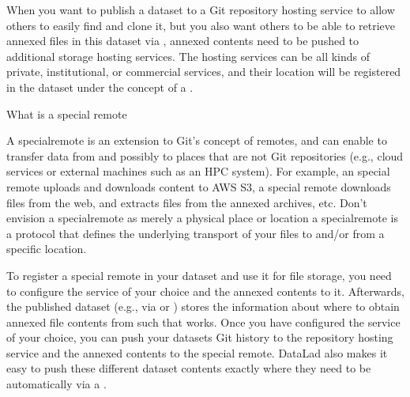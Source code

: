 \sphinxAtStartPar
When you want to publish a dataset to a Git repository hosting service to allow others to easily find and clone it, but you also want others to be able to retrieve annexed files in this dataset via , annexed contents need to be pushed to additional storage hosting services.
The hosting services can be all kinds of private, institutional, or commercial services, and their location will be registered in the dataset under the concept of a {\hyperref[\detokenize{glossary:term-special-remote}]{}}.

\ignorespaces \begin{findoutmore}[label={index-0}, before title={\thetcbcounter\ }, check odd page=true]{What is a special remote}
\label{\detokenize{basics/101-138-sharethirdparty:index-0}}

\sphinxAtStartPar
A special\sphinxhyphen{}remote is an extension to Git’s concept of remotes, and can
enable {\hyperref[\detokenize{glossary:term-git-annex}]{}} to transfer data from and possibly to places that are not Git
repositories (e.g., cloud services or external machines such as an HPC
system). For example, an  special remote uploads and downloads content
to AWS S3, a  special remote downloads files from the web, and 
extracts files from the annexed archives, etc. Don’t envision a special\sphinxhyphen{}remote
as merely a physical place or location \textendash{} a special\sphinxhyphen{}remote is a protocol that
defines the underlying transport of your files to and/or from a specific location.


\end{findoutmore}

\sphinxAtStartPar
To register a special remote in your dataset and use it for file storage, you need to configure the service of your choice and  the annexed contents to it. Afterwards, the published dataset (e.g., via {\hyperref[\detokenize{glossary:term-GitHub}]{}} or {\hyperref[\detokenize{glossary:term-GitLab}]{}}) stores the information about where to obtain annexed file contents from such that
 works.
Once you have configured the service of your choice, you can push your datasets Git history to the repository hosting service and the annexed contents to the special remote. DataLad also makes it easy to push these different dataset contents exactly where they need to be automatically via a {\hyperref[\detokenize{glossary:term-publication-dependency}]{}}.

